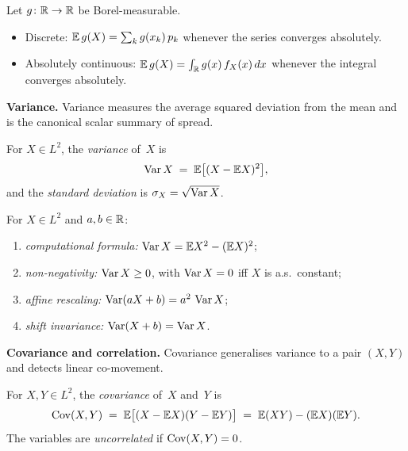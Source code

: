\begin{proposition}
\label{prop:lotus}
Let $g \colon \mathbb{R} \to \mathbb{R}$ be Borel-measurable.
\begin{itemize}
  \item Discrete: $\mathbb{E}\, g(X) = \sum_k g(x_k)\, p_k$ whenever the series
    converges absolutely.
  \item Absolutely continuous: $\mathbb{E}\, g(X) = \int_{\mathbb{R}} g(x)\, f_X(x)\, dx$
    whenever the integral converges absolutely.
\end{itemize}
\end{proposition}

\medskip
\noindent\textbf{Variance.} Variance measures the average squared
deviation from the mean and is the canonical scalar summary of
spread.

\begin{definition}
\label{def:variance}
For $X \in L^2$, the \emph{variance} of~$X$ is
\[
  \operatorname{Var} X \;=\; \mathbb{E}\bigl[(X - \mathbb{E} X)^2\bigr],
\]
and the \emph{standard deviation} is $\sigma_X = \sqrt{\operatorname{Var} X}$.
\end{definition}

\begin{proposition}
\label{prop:var-properties}
For $X \in L^2$ and $a, b \in \mathbb{R}$:
\begin{enumerate}[label=(\alph*)]
  \item \emph{computational formula:} $\operatorname{Var} X = \mathbb{E} X^2 - (\mathbb{E} X)^2$;
  \item \emph{non-negativity:} $\operatorname{Var} X \geq 0$, with $\operatorname{Var} X = 0$ iff $X$ is a.s.\ constant;
  \item \emph{affine rescaling:} $\operatorname{Var}(aX + b) = a^2\, \operatorname{Var} X$;
  \item \emph{shift invariance:} $\operatorname{Var}(X + b) = \operatorname{Var} X$.
\end{enumerate}
\end{proposition}

\medskip
\noindent\textbf{Covariance and correlation.} Covariance generalises
variance to a pair $(X, Y)$ and detects linear co-movement.

\begin{definition}[Covariance]
\label{def:covariance}
For $X, Y \in L^2$, the \emph{covariance} of~$X$ and~$Y$ is
\[
  \operatorname{Cov}(X, Y) \;=\; \mathbb{E}\bigl[(X - \mathbb{E} X)(Y - \mathbb{E} Y)\bigr] \;=\; \mathbb{E}(XY) - (\mathbb{E} X)(\mathbb{E} Y).
\]
The variables are \emph{uncorrelated} if $\operatorname{Cov}(X, Y) = 0$.
\end{definition}

